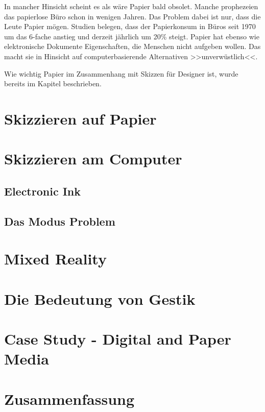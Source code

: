 \medskip In mancher Hinsicht scheint es als wäre Papier bald obsolet. Manche prophezeien das papierlose Büro schon in wenigen Jahren. Das Problem dabei ist nur, dass die Leute Papier mögen. Studien belegen, dass der Papierkonsum in Büros seit 1970 um das 6-fache anstieg und derzeit jährlich um 20\% steigt. \citep{seybold:1992} Papier hat ebenso wie elektronische Dokumente Eigenschaften, die Menschen nicht aufgeben wollen. Das macht sie in Hinsicht auf computerbasierende Alternativen >>unverwüstlich<<. \citep{Luff:1992}

Wie wichtig Papier im Zusammenhang mit Skizzen für Designer ist, wurde bereits im Kapitel  beschrieben.


\section{Skizzieren auf Papier}

\section{Skizzieren am Computer}

\subsection{Electronic Ink}

\subsection{Das Modus Problem}\label{sec:ModusProblem}

\section{Mixed Reality}

\section{Die Bedeutung von Gestik}

\section{Case Study - Digital and Paper Media}

\section*{Zusammenfassung}